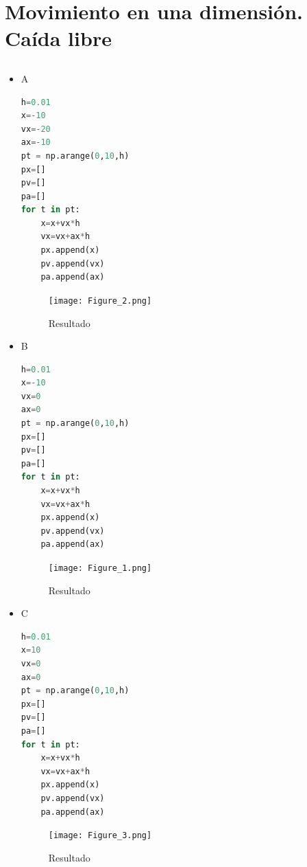 \documentclass{article}
\begin{document}
\section{Movimiento en una dimensión. Caída libre}
\subsection{}
\begin{itemize}
    \item A
\begin{lstlisting}[language=Python,caption=Ejercicio 1]
h=0.01
x=-10
vx=-20
ax=-10
pt = np.arange(0,10,h)
px=[]
pv=[]
pa=[]
for t in pt:
    x=x+vx*h
    vx=vx+ax*h
    px.append(x)
    pv.append(vx)
    pa.append(ax)
\end{lstlisting}
\begin{figure}[H]
    \centering
    \texttt{[image: Figure\_2.png]}
    \caption{Resultado}
\end{figure}

    \item B
\begin{lstlisting}[language=Python,caption=Ejercicio 2]
h=0.01
x=-10
vx=0
ax=0
pt = np.arange(0,10,h)
px=[]
pv=[]
pa=[]
for t in pt:
    x=x+vx*h
    vx=vx+ax*h
    px.append(x)
    pv.append(vx)
    pa.append(ax)
\end{lstlisting}
    \begin{figure}[H]
    \centering
    \texttt{[image: Figure\_1.png]}
    \caption{Resultado}
\end{figure}

    \item C
\begin{lstlisting}[language=Python,caption=Ejercicio 3]
h=0.01
x=10
vx=0
ax=0
pt = np.arange(0,10,h)
px=[]
pv=[]
pa=[]
for t in pt:
    x=x+vx*h
    vx=vx+ax*h
    px.append(x)
    pv.append(vx)
    pa.append(ax)
\end{lstlisting}
\begin{figure}[H]
    \centering
    \texttt{[image: Figure\_3.png]}
    \caption{Resultado}
\end{figure}

\end{itemize}

\end{document}
